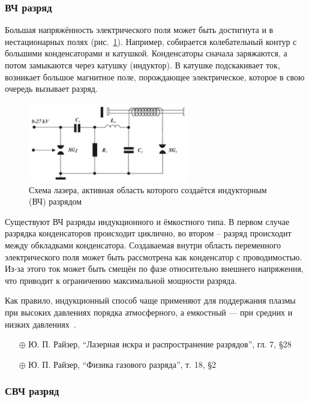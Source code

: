 \documentclass[10pt, a4paper]{article}
\begin{document}
\subsubsection{ВЧ разряд}

Большая напряжённость электрического поля может быть достигнута и в нестационарных полях (рис.~\ref{fig:RF_dicharge}). Например, собирается колебательный контур с большими конденсаторами и катушкой. Конденсаторы сначала заряжаются, а потом замыкаются через катушку (индуктор). В катушке подскакивает ток, возникает большое магнитное поле, порождающее электрическое, которое в свою очередь вызывает разряд.

\begin{figure}[ht]
	\begin{center}
		\includegraphics[width=70mm]{12.5.jpg}
	\end{center}
	\caption{Схема лазера, активная область которого создаётся индукторным (ВЧ) разрядом}
	\label{fig:RF_dicharge}
\end{figure}

Существуют ВЧ разряды индукционного и ёмкостного типа. В первом случае разрядка конденсаторов происходит циклично, во втором -- разряд происходит между обкладками конденсатора. Создаваемая внутри область переменного электрического поля может быть рассмотрена как конденсатор с проводимостью. Из-за этого ток может быть смещён по фазе относительно внешнего напряжения, что приводит к ограничению максимальной мощности разряда.

Как правило, индукционный способ чаще применяют для поддержания плазмы при высоких давлениях порядка атмосферного, а емкостный — при средних и низких давлениях~\cite{raizer}.

\begin{itemize}
	\item[$\oplus$] Ю. П. Райзер, ``Лазерная искра и распространение разрядов'', гл. 7, \S 28
	\item[$\oplus$] Ю. П. Райзер, ``Физика газового разряда'', т. 18, \S 2
\end{itemize}

\subsubsection{СВЧ разряд}
\end{document}
